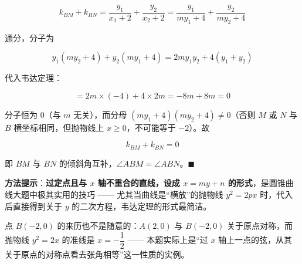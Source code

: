 \begin{answer}
\nopagebreak[4]
\[k_{BM}+k_{BN}=\frac{y_1}{x_1+2}+\frac{y_2}{x_2+2}=\frac{y_1}{my_1+4}+\frac{y_2}{my_2+4}\]

通分，分子为

\nopagebreak[4]
\[y_1\left(my_2+4\right)+y_2\left(my_1+4\right)=2my_1y_2+4\left(y_1+y_2\right)\]

代入韦达定理：

\nopagebreak[4]
\[=2m\times(-4)+4\times2m=-8m+8m=0\]

分子恒为 $0$（与 $m$ 无关），而分母 $\left(my_1+4\right)\left(my_2+4\right)\ne0$（否则 $M$ 或 $N$ 与 $B$ 横坐标相同，但抛物线上 $x\ge0$，不可能等于 $-2$）。故

\nopagebreak[4]
\[k_{BM}+k_{BN}=0\]

即 $BM$ 与 $BN$ 的倾斜角互补，$\angle ABM=\angle ABN$。$\blacksquare$

\begin{gktip}
\textbf{方法提示}：\textbf{过定点且与 $x$ 轴不重合的直线，设成 $x=my+n$ 的形式}，是圆锥曲线大题中极其实用的技巧 —— 尤其当曲线是“横放”的抛物线 $y^{2}=2px$ 时，代入后直接得到关于 $y$ 的二次方程，韦达定理的形式最简洁。

点 $B(-2,0)$ 的来历也不是随意的：$A(2,0)$ 与 $B(-2,0)$ 关于原点对称，而抛物线 $y^{2}=2x$ 的准线是 $x=-\dfrac12$ —— 本题实际上是“过 $x$ 轴上一点的弦，从其关于原点的对称点看去张角相等”这一性质的实例。
\end{gktip}



\par\medskip

\end{answer}
